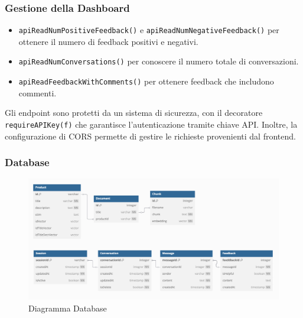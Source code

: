 \subsubsection*{Gestione della Dashboard}
\begin{itemize}
    \item \texttt{apiReadNumPositiveFeedback()} e \texttt{apiReadNumNegativeFeedback()} per ottenere il numero di feedback positivi e negativi.
    \item \texttt{apiReadNumConversations()} per conoscere il numero totale di conversazioni.
    \item \texttt{apiReadFeedbackWithComments()} per ottenere feedback che includono commenti.
\end{itemize}

Gli endpoint sono protetti da un sistema di sicurezza, con il decoratore \texttt{requireAPIKey(f)} che garantisce l’autenticazione tramite chiave API. Inoltre, la configurazione di CORS permette di gestire le richieste provenienti dal frontend.

\subsubsection{Database}
\begin{figure}[H]
    \centering
    \includegraphics[width=\textwidth]{images/DB.png}
    \caption{Diagramma Database}
    \label{fig:Diagramma Database}
\end{figure}

